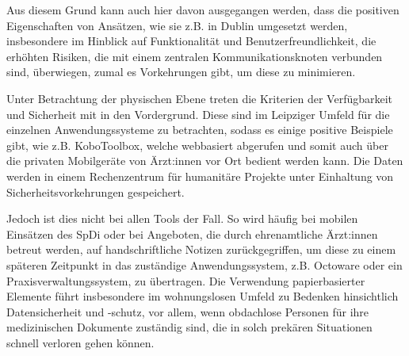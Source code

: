 Aus diesem Grund kann auch hier davon ausgegangen werden, dass die positiven Eigenschaften von Ansätzen, wie sie z.B. in Dublin umgesetzt werden, insbesondere im Hinblick auf Funktionalität und Benutzerfreundlichkeit, die erhöhten Risiken, die mit einem zentralen Kommunikationsknoten verbunden sind, überwiegen, zumal es Vorkehrungen gibt, um diese zu minimieren.

Unter Betrachtung der physischen Ebene treten die Kriterien der Verfügbarkeit und Sicherheit mit in den Vordergrund. Diese sind im Leipziger Umfeld für die einzelnen Anwendungssysteme zu betrachten, sodass es einige positive Beispiele gibt, wie z.B. KoboToolbox, welche webbasiert abgerufen und somit auch über die privaten Mobilgeräte von Ärzt:innen vor Ort bedient werden kann. Die Daten werden in einem Rechenzentrum für humanitäre Projekte unter Einhaltung von Sicherheitsvorkehrungen gespeichert.

Jedoch ist dies nicht bei allen Tools der Fall. So wird häufig bei mobilen Einsätzen des \ac{SpDi} oder bei Angeboten, die durch ehrenamtliche Ärzt:innen betreut werden, auf handschriftliche Notizen zurückgegriffen, um diese zu einem späteren Zeitpunkt in das zuständige Anwendungssystem, z.B. Octoware oder ein Praxisverwaltungssystem, zu übertragen. Die Verwendung papierbasierter Elemente führt insbesondere im wohnungslosen Umfeld zu Bedenken hinsichtlich Datensicherheit und -schutz, vor allem, wenn obdachlose Personen für ihre medizinischen Dokumente zuständig sind, die in solch prekären Situationen schnell verloren gehen können.